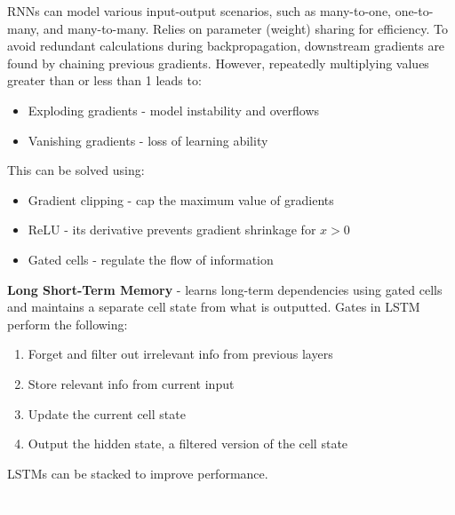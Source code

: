 \documentclass[10pt,landscape]{article}
\begin{document}
\begin{multicols}{3}
RNNs can model various input-output scenarios, such as many-to-one, one-to-many, and many-to-many. Relies on parameter (weight) sharing for efficiency. To avoid redundant calculations during backpropagation, downstream gradients are found by chaining previous gradients. However, repeatedly multiplying values greater than or less than 1 leads to:
\begin{itemize}[label={--},leftmargin=4mm]
\itemsep -.4mm 
\item Exploding gradients - model instability and overflows
\item Vanishing gradients - loss of learning ability
\end{itemize}
This can be solved using:
\begin{itemize}[label={--},leftmargin=4mm]
\itemsep -.4mm 
\item Gradient clipping - cap the maximum value of gradients
\item ReLU - its derivative prevents gradient shrinkage for $x > 0$ 
\item Gated cells - regulate the flow of information
\end{itemize}

\textbf{Long Short-Term Memory} - learns long-term dependencies using gated cells and maintains a separate cell state from what is outputted. Gates in LSTM perform the following:

\begin{enumerate}[leftmargin=5mm]
\itemsep -.4mm 
\item Forget and filter out irrelevant info from previous layers
\item Store relevant info from current input
\item Update the current cell state
\item Output the hidden state, a filtered version of the cell state
\end{enumerate}
LSTMs can be stacked to improve performance.

\columnbreak
\textcolor{white}{.}\vspace{-3mm}\\ %

\end{multicols}
\end{document}

